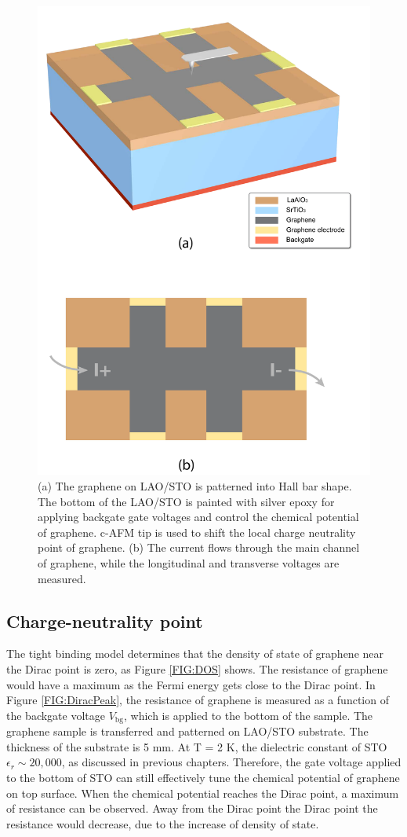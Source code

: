\documentclass[pdflatex, sectionletters, 12pt]{pittetd}    %
\begin{document}
\begin{figure}[p]
	\centering
	\includegraphics[width=.7\textwidth]{Drawing/HallDevice.pdf}
 	\caption{(a) The graphene on LAO/STO is patterned into Hall bar shape. The bottom of the LAO/STO is painted with silver epoxy for applying backgate gate voltages and control the chemical potential of graphene. c-AFM tip is used to shift the local charge neutrality point of graphene. (b) The current flows through the main channel of graphene, while the longitudinal and transverse voltages are measured.}
	\label{FIG:HallDevice}
\end{figure}

\subsection{Charge-neutrality point}

The tight binding model determines that the density of state of graphene near the Dirac point is zero\cite{neto2009electronic}, as Figure \ref{FIG:DOS} shows. The resistance of graphene would have a maximum as the Fermi energy gets close to the Dirac point. In Figure \ref{FIG:DiracPeak}, the resistance of graphene is measured as a function of the backgate voltage $V_\mathrm{bg}$, which is applied to the bottom of the sample. The graphene sample is transferred and patterned on LAO/STO substrate. The thickness of the substrate is 5 mm. At T = 2 K, the dielectric constant of STO $\epsilon_r \sim 20,000$, as discussed in previous chapters. Therefore, the gate voltage applied to the bottom of STO can still effectively tune the chemical potential of graphene on top surface. When the chemical potential reaches the Dirac point, a maximum of resistance can be observed. Away from the Dirac point the Dirac point the resistance would decrease, due to the increase of density of state. 
\\
\end{document}

